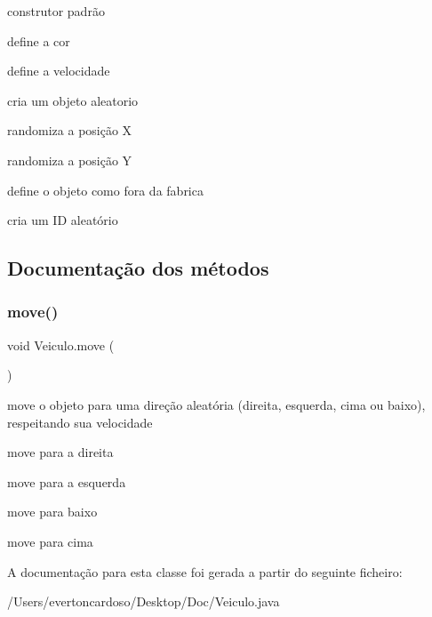 construtor padrão 

define a cor

define a velocidade

cria um objeto aleatorio

randomiza a posição X

randomiza a posição Y

define o objeto como fora da fabrica

cria um ID aleatório 

\subsection{Documentação dos métodos}
\mbox{\label{class_veiculo_a3341b0ed6b4d34db990a31f7a499ae80}} 
\subsubsection{\texorpdfstring{move()}{move()}}
{\footnotesize\ttfamily void Veiculo.\+move (\begin{DoxyParamCaption}{ }\end{DoxyParamCaption})}



move o objeto para uma direção aleatória (direita, esquerda, cima ou baixo), respeitando sua velocidade 

move para a direita

move para a esquerda

move para baixo

move para cima 

A documentação para esta classe foi gerada a partir do seguinte ficheiro\+:\begin{DoxyCompactItemize}
\item 
/\+Users/evertoncardoso/\+Desktop/\+Doc/Veiculo.\+java\end{DoxyCompactItemize}
